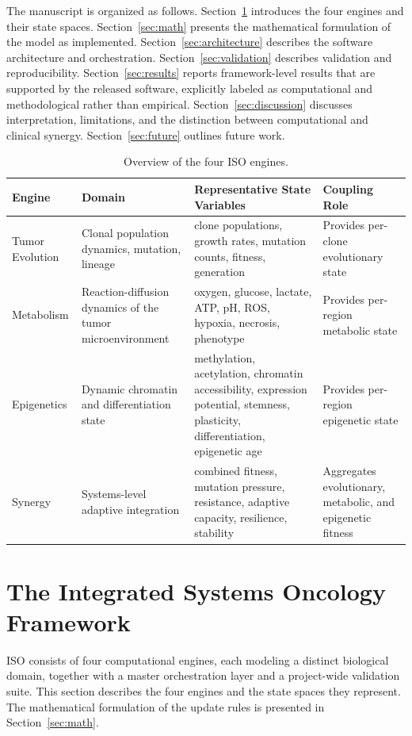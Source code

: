 \documentclass[12pt,a4paper]{article}
\begin{document}
The manuscript is organized as follows. Section~\ref{sec:framework} introduces the four engines and their state spaces. Section~\ref{sec:math} presents the mathematical formulation of the model as implemented. Section~\ref{sec:architecture} describes the software architecture and orchestration. Section~\ref{sec:validation} describes validation and reproducibility. Section~\ref{sec:results} reports framework-level results that are supported by the released software, explicitly labeled as computational and methodological rather than empirical. Section~\ref{sec:discussion} discusses interpretation, limitations, and the distinction between computational and clinical synergy. Section~\ref{sec:future} outlines future work.

\begin{table}[H]
\centering
\caption{Overview of the four ISO engines.}
\label{tab:engine_overview}
\begin{tabular}{p{2.4cm} p{4.2cm} p{4.2cm} p{2.4cm}}
\toprule
\textbf{Engine} & \textbf{Domain} & \textbf{Representative State Variables} & \textbf{Coupling Role} \\
\midrule
Tumor Evolution & Clonal population dynamics, mutation, lineage & clone populations, growth rates, mutation counts, fitness, generation & Provides per-clone evolutionary state \\
Metabolism & Reaction-diffusion dynamics of the tumor microenvironment & oxygen, glucose, lactate, ATP, pH, ROS, hypoxia, necrosis, phenotype & Provides per-region metabolic state \\
Epigenetics & Dynamic chromatin and differentiation state & methylation, acetylation, chromatin accessibility, expression potential, stemness, plasticity, differentiation, epigenetic age & Provides per-region epigenetic state \\
Synergy & Systems-level adaptive integration & combined fitness, mutation pressure, resistance, adaptive capacity, resilience, stability & Aggregates evolutionary, metabolic, and epigenetic fitness \\
\bottomrule
\end{tabular}
\end{table}

\section{The Integrated Systems Oncology Framework}
\label{sec:framework}

ISO consists of four computational engines, each modeling a distinct biological domain, together with a master orchestration layer and a project-wide validation suite. This section describes the four engines and the state spaces they represent. The mathematical formulation of the update rules is presented in Section~\ref{sec:math}.
\end{document}
